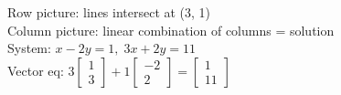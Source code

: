 \documentclass[preview]{standalone}
\begin{document}
Row picture: lines intersect at (3, 1)\\Column picture: linear combination of columns = solution\\System: $x - 2y = 1,\; 3x + 2y = 11$\\Vector eq: $3\begin{bmatrix}1\\3\end{bmatrix}+1\begin{bmatrix}-2\\2\end{bmatrix}=\begin{bmatrix}1\\11\end{bmatrix}$\\
\end{document}
